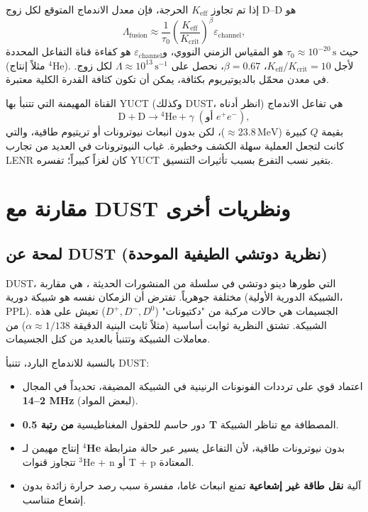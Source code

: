 \documentclass[11pt,a4paper]{article}
\newcommand{\Keff}{K_{\mathrm{eff}}}
\newcommand{\Kcrit}{K_{\mathrm{crit}}}
\theoremstyle{remark}
\begin{document}
	إذا تم تجاوز \(\Keff\) الحرجة، فإن معدل الاندماج المتوقع لكل زوج D–D هو
	\begin{equation}
		\Lambda_{\text{fusion}} \approx \frac{1}{\tau_0} \left( \frac{\Keff}{\Kcrit} \right)^{\beta} \varepsilon_{\text{channel}},
		\label{eq:fusion-rate}
	\end{equation}
	حيث \(\tau_0 \approx 10^{-20}\,\text{s}\) هو المقياس الزمني النووي، و\(\varepsilon_{\text{channel}}\) هو كفاءة قناة التفاعل المحددة (مثلاً إنتاج \(^4\)He). لأجل \(\Keff/\Kcrit = 10\)، \(\beta = 0.67\)، نحصل على \(\Lambda \approx 10^{13}\,\text{s}^{-1}\) لكل زوج. في معدن محمّل بالديوتيريوم بكثافة، يمكن أن تكون كثافة القدرة الكلية معتبرة.
	
	القناة المهيمنة التي تتنبأ بها YUCT (وكذلك DUST، انظر أدناه) هي تفاعل الاندماج
	\[
	\mathrm{D} + \mathrm{D} \to {}^4\mathrm{He} + \gamma\;(\text{أو } e^+e^-),
	\]
	بقيمة \(Q\) كبيرة (\(\approx 23.8\,\text{MeV}\))، لكن بدون انبعاث نيوترونات أو تريتيوم طاقية، والتي كانت لتجعل العملية سهلة الكشف وخطيرة. غياب النيوترونات في العديد من تجارب LENR كان لغزاً كبيراً؛ تفسره YUCT بتغير نسب التفرع بسبب تأثيرات التنسيق.
	
	\section{مقارنة مع DUST ونظريات أخرى}
	\label{sec:comparison}
	
	\subsection{لمحة عن DUST (نظرية دوتشي الطيفية الموحدة)}
	
	DUST، التي طورها دينو دوتشي في سلسلة من المنشورات الحديثة \cite{Ducci2025,Ducci2026a,Ducci2026b}، هي مقاربة مختلفة جوهرياً. تفترض أن الزمكان نفسه هو شبيكة دورية (الشبيكة الدورية الأولية، PPL). الجسيمات هي حالات مركبة من "دكتيونات" (\(D^+, D^-, D^0\)) تعيش على هذه الشبيكة. تشتق النظرية ثوابت أساسية (مثلاً ثابت البنية الدقيقة \(\alpha \approx 1/138\)) من معاملات الشبيكة وتتنبأ بالعديد من كتل الجسيمات.
	
	بالنسبة للاندماج البارد، تتنبأ DUST:
	\begin{itemize}
		\item اعتماد قوي على ترددات الفونونات الرنينية في الشبيكة المضيفة، تحديداً في المجال \textbf{2–14 MHz} (لبعض المواد).
		\item دور حاسم للحقول المغناطيسية \textbf{من رتبة 0.5 T} المصطافة مع تناظر الشبيكة.
		\item إنتاج مهيمن لـ \textbf{\(^4\)He} بدون نيوترونات طاقية، لأن التفاعل يسير عبر حالة مترابطة تتجاوز قنوات \(^3\)He + n أو T + p المعتادة.
		\item آلية \textbf{نقل طاقة غير إشعاعية} تمنع انبعاث غاما، مفسرة سبب رصد حرارة زائدة بدون إشعاع متناسب.
	\end{itemize}
	
\end{document}

